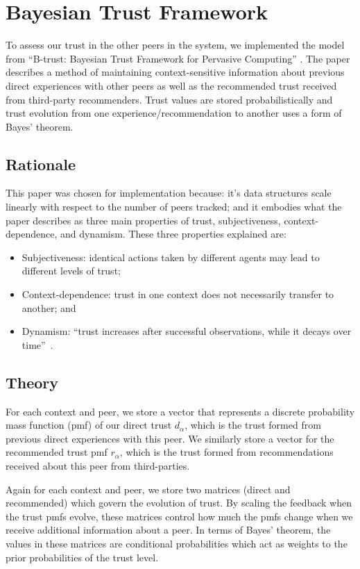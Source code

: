 \section{Bayesian Trust Framework}
To assess our trust in the other peers in the system, we implemented
the model from ``B-trust: Bayesian Trust Framework for Pervasive Computing''
\cite{btrust}. The paper describes a method of maintaining context-sensitive
information about previous direct experiences with other peers as well as
the recommended trust received from third-party recommenders. Trust values
are stored probabilistically and trust evolution from one
experience/recommendation to another uses a form of Bayes' theorem.

\subsection{Rationale}
This paper was chosen for implementation because: it's data structures scale
linearly with respect to the number of peers tracked; and it embodies what
the paper describes as three main properties of trust, subjectiveness,
context-dependence, and dynamism. These three properties explained are:
\begin{itemize}
  \item Subjectiveness: identical actions taken by different agents may lead to
  different levels of trust;
  \item Context-dependence: trust in one context does not necessarily transfer
  to another; and
  \item Dynamism: ``trust increases after successful observations, while it
  decays over time''~\cite{btrust}.
\end{itemize}


\subsection{Theory}
For each context and peer, we store a vector that represents a discrete
probability mass function (pmf) of our direct trust $d_\alpha$, which is the
trust formed from previous direct experiences with this peer. We similarly store a
vector for the recommended trust pmf $r_\alpha$, which is the trust formed from
recommendations received about this peer from third-parties.

Again for each context and peer, we store two matrices (direct and recommended)
which govern the evolution of trust. By scaling the feedback when the trust
pmfs evolve, these matrices control how much the pmfs change when we receive
additional information about a peer. In terms of Bayes' theorem, the
values in these matrices are conditional probabilities which act as weights
to the prior probabilities of the trust level.

